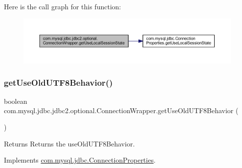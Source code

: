 Here is the call graph for this function\+:
\nopagebreak
\begin{figure}[H]
\begin{center}
\leavevmode
\includegraphics[width=350pt]{classcom_1_1mysql_1_1jdbc_1_1jdbc2_1_1optional_1_1_connection_wrapper_a89f23fef1e3b4df8c13e316baa05bb6a_cgraph}
\end{center}
\end{figure}
\mbox{\label{classcom_1_1mysql_1_1jdbc_1_1jdbc2_1_1optional_1_1_connection_wrapper_aab5bc3ee546eb81a0fd5a28b576f6338}} 
\subsubsection{\texorpdfstring{get\+Use\+Old\+U\+T\+F8\+Behavior()}{getUseOldUTF8Behavior()}}
{\footnotesize\ttfamily boolean com.\+mysql.\+jdbc.\+jdbc2.\+optional.\+Connection\+Wrapper.\+get\+Use\+Old\+U\+T\+F8\+Behavior (\begin{DoxyParamCaption}{ }\end{DoxyParamCaption})}

\begin{DoxyReturn}{Returns}
Returns the use\+Old\+U\+T\+F8\+Behavior. 
\end{DoxyReturn}


Implements \mbox{\hyperlink{interfacecom_1_1mysql_1_1jdbc_1_1_connection_properties_a4f8cf54b1bafd8f3e11f32f5c3609dd6}{com.\+mysql.\+jdbc.\+Connection\+Properties}}.

